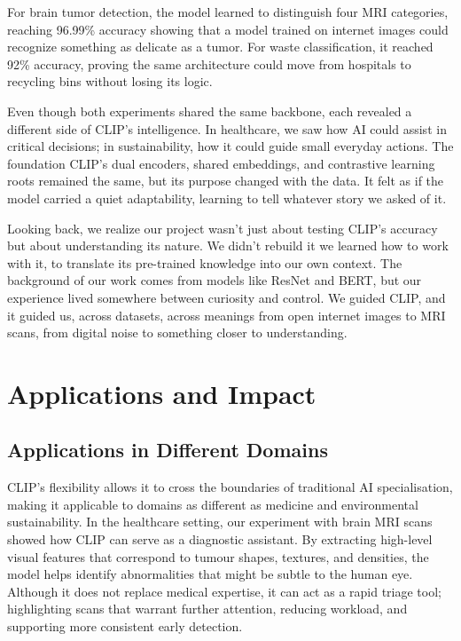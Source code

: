 \documentclass[12pt]{article}
\begin{document}
For brain tumor detection, the model learned to distinguish four MRI categories, reaching 96.99\% accuracy showing that a model trained on internet images could recognize something as delicate as a tumor. For waste classification, it reached 92\% accuracy, proving the same architecture could move from hospitals to recycling bins without losing its logic.

Even though both experiments shared the same backbone, each revealed a different side of CLIP’s intelligence. In healthcare, we saw how AI could assist in critical decisions; in sustainability, how it could guide small everyday actions. The foundation CLIP’s dual encoders, shared embeddings, and contrastive learning roots remained the same, but its purpose changed with the data. It felt as if the model carried a quiet adaptability, learning to tell whatever story we asked of it.

Looking back, we realize our project wasn’t just about testing CLIP’s accuracy but about understanding its nature. We didn’t rebuild it we learned how to work with it, to translate its pre-trained knowledge into our own context. The background of our work comes from models like ResNet and BERT, but our experience lived somewhere between curiosity and control. We guided CLIP, and it guided us, across datasets, across meanings from open internet images to MRI scans, from digital noise to something closer to understanding.
\newpage

\section{Applications and Impact}

\subsection{Applications in Different Domains}
CLIP’s flexibility allows it to cross the boundaries of traditional AI specialisation, making it applicable to domains as different as medicine and environmental sustainability. In the healthcare setting, our experiment with brain MRI scans showed how CLIP can serve as a diagnostic assistant. By extracting high-level visual features that correspond to tumour shapes, textures, and densities, the model helps identify abnormalities that might be subtle to the human eye. Although it does not replace medical expertise, it can act as a rapid triage tool; highlighting scans that warrant further attention, reducing workload, and supporting more consistent early detection.  
\vspace{0.3em}
\end{document}
